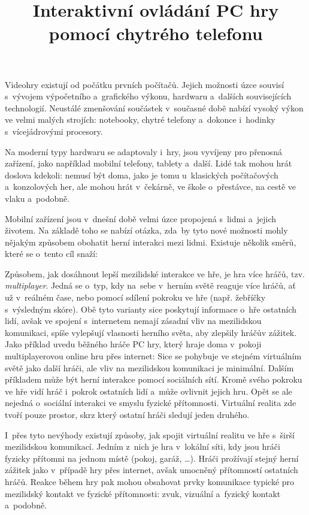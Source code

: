 \documentclass[thesis=B,czech,hidelinks]{FITthesis}[2012/06/26] %
\title{Interaktivn{\' i} ovl{\' a}d{\' a}n{\' i} PC hry pomoc{\' i} chytr{\' e}ho telefonu}
\begin{document}
 

\begin{introduction}
Videohry existují od počátku prvních počítačů. \cite{rylich} Jejich možnosti úzce souvisí s~vývojem výpočetního a~grafického výkonu, hardwaru a~dalších souvisejících technologií. Neustálé zmenšování součástek v~současné době nabízí vysoký výkon ve velmi malých strojích: notebooky, chytré telefony a~dokonce i~hodinky s~vícejádrovými procesory. \cite{kupi}

Na moderní typy hardwaru se adaptovaly i~hry, jsou vyvíjeny pro přenosná zařízení, jako například mobilní telefony, tablety a~další. Lidé tak mohou hrát doslova kdekoli: nemusí být doma, jako je tomu u~klasických počítačových a~konzolových her, ale mohou hrát v~čekárně, ve škole o~přestávce, na cestě ve vlaku a~podobně.

Mobilní zařízení jsou v~dnešní době velmi úzce propojená s~lidmi a~jejich životem. Na základě toho se nabízí otázka, zda~by tyto nové možnosti mohly nějakým způsobem obohatit herní interakci mezi lidmi. Existuje několik směrů, které se o~tento cíl snaží:

Způsobem, jak dosáhnout lepší mezilidské interakce ve hře, je hra více hráčů, tzv. \textit{multiplayer}. Jedná se o~typ, kdy na~sebe v~herním světě reaguje více hráčů, ať už v~reálném čase, nebo pomocí sdílení pokroku ve hře (např. žebříčky s~výsledným skóre). Obě tyto varianty sice poskytují informace o~hře ostatních lidí, avšak ve spojení s~internetem nemají zásadní vliv na mezilidskou komunikaci, spíše vylepšují vlasnosti herního světa, aby zlepšily hráčův zážitek. Jako příklad uvedu běžného hráče PC hry, který hraje doma v~pokoji multiplayerovou online hru přes internet: Sice se pohybuje ve stejném virtuálním světě jako další hráči, ale vliv na mezilidskou komunikaci je minimální. Dalším příkladem může být herní interakce pomocí sociálních sítí. Kromě svého pokroku ve hře vidí hráč i~pokrok ostatních lidí a~může ovlivnit jejich hru. Opět se ale nejedná o~sociální interakci ve smyslu fyzické přítomnosti. Virtuální realita zde tvoří pouze prostor, skrz který ostatní hráči sledují jeden druhého.

I~přes tyto nevýhody existují způsoby, jak spojit virtuální realitu ve hře s~širší mezilidskou komunikací. Jedním z~nich je hra v~lokální síti, kdy jsou hráči fyzicky přítomni na jednom místě (pokoj, garáž, …). Hráči prožívají stejný herní zážitek jako v~případě hry přes internet, avšak umocněný přítomností ostatních hráčů. Reakce během hry pak mohou obsahovat prvky komunikace typické pro mezilidský kontakt ve fyzické přítomnosti: zvuk, vizuální a~fyzický kontakt a~podobně.


\end{introduction}
\end{document}
